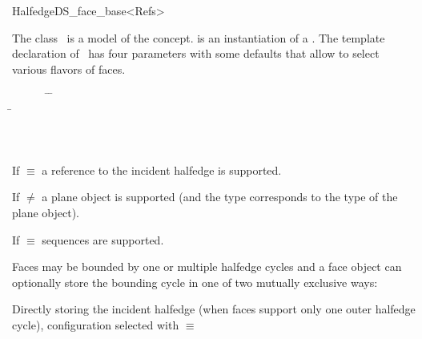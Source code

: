 
\ccRefPageBegin



\begin{ccRefClass}{HalfedgeDS_face_base<Refs>}
  
\ccDefinition
  
The class \ccRefName\ is a model of the 
concept.  is an instantiation of a .  The
template declaration of \ccRefName\ has {\XHDS four} parameters with some
defaults that allow to select various flavors of faces. 

{\XHDS

\begin{tabbing}
\mbox{}~~~~~~ \=  \=\\
              \> \> \=\\
              \> \> \>\\
              \> \> \>\\
     \> 
\end{tabbing}

If  $\equiv$  a reference to the incident halfedge is supported.

If  $\neq$  a plane object is supported (and the type  corresponds to the type of the plane object).

If  $\equiv$   sequences are supported.


Faces may be bounded by one or multiple halfedge cycles and a face object can optionally store the bounding cycle in one of two mutually exclusive ways: 

Directly storing the incident halfedge (when faces support only one outer halfedge cycle), configuration selected
with  $\equiv$ 

}
\end{ccRefClass}
